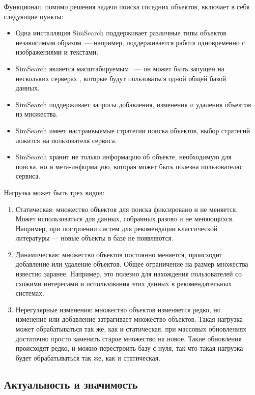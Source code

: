 \documentclass[a4paper,12pt]{extarticle}
\begin{document}
Функционал, помимо решения задачи поиска соседних объектов, включает в себя следующие пункты:
\begin{itemize}
    \item Одна инсталляция SimSearch поддерживает различные типы объектов независимым образом~--- например, поддерживается работа одновременно с изображениями и текстами.
    \item SimSearch является масштабируемым \cite{enwiki:1086627524}~--- он может быть запущен на нескольких серверах \cite{enwiki:1086236982}, которые будут пользоваться одной общей базой данных.
    \item SimSearch поддерживает запросы добавления, изменения и удаления объектов из множества.
    \item SimSearch имеет настраивыемые стратегии поиска объектов, выбор стратегий ложится на пользователя сервиса.
    \item SimSearch хранит не только информацию об объекте, необходимую для поиска, но и мета-информацию, которая может быть полезна пользователю сервиса.
\end{itemize}

Нагрузка может быть трех видов:
\begin{enumerate}
    \item Статическая: множество объектов для поиска фиксировано и не меняется. Может использоваться для данных, собранных разово и не меняющихся. Например, при построении систем для рекомендации классической литературы --- новые объекты в базе не появляются.
    \item Динамическая: множество объектов постоянно меняется, происходит добавление или удаление объектов. Общее ограничение на размер множества известно заранее. Например, это полезно для нахождения пользователей со схожими интересами и использования этих данных в рекомендательных системах.
    \item Нерегулярные изменения: множество объектов изменяется редко, но изменение или добавление затрагивает множество объектов. Такая нагрузка может обрабатываться так же, как и статическая, при массовых обновлениях достаточно просто заменить старое множество на новое. Такие обновления происходят редко, и можно перестроить базу с нуля, так что такая нагрузка будет обрабатываться так же, как и статическая.
\end{enumerate}

\subsection{Актуальность и значимость}
\end{document}
